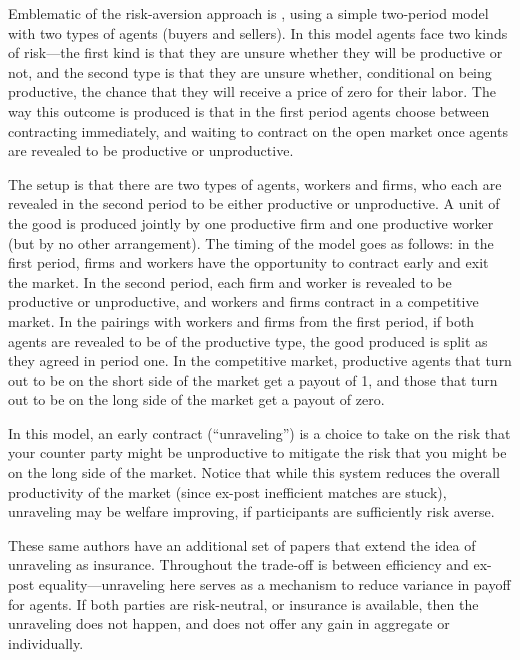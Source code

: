 \documentclass[WP]{AEA}
\begin{document}
Emblematic of the risk-aversion approach is \cite{Li1998}, using a simple two-period model with two types of agents (buyers and sellers).  
In this model agents face two kinds of risk—the first kind is that they are unsure whether they will be productive or not, and the second type is that they are unsure whether, conditional on being productive, the chance that they will receive a price of zero for their labor.  The way this outcome is produced is that in the first period agents choose between contracting immediately, and waiting to contract on the open market once agents are revealed to be productive or unproductive.  

The setup is that there are two types of agents, workers and firms, who each are revealed in the second period to be either productive or unproductive. A unit of the good is produced jointly by one productive firm and one productive worker (but by no other arrangement). The timing of the model goes as follows: in the first period, firms and workers have the opportunity to contract early and exit the market. In the second period, each firm and worker is revealed  to be productive or unproductive, and workers and firms contract in a competitive market.  In the pairings with workers and firms from the first period, if both agents are revealed to be of the productive type, the good produced is split as they agreed in period one. In the competitive market, productive agents that turn out to be on the short side of the market get a payout of 1, and those that turn out to be on the long side of the market get a payout of zero.


In this model, an early contract (``unraveling'')  is a choice to take on the risk that your counter party might be unproductive to mitigate the risk that you might be on the long side of the market.  Notice that while this system reduces the overall productivity of the market (since ex-post inefficient matches are stuck), unraveling may be welfare improving, if participants are sufficiently risk averse.

These same authors have an additional set of papers \cite{Li2000,Li2004}  that extend the idea of unraveling as insurance.  Throughout the trade-off is between efficiency and ex-post equality—unraveling here serves as a mechanism to reduce variance in payoff for agents.  If both parties are risk-neutral, or insurance is available, then the unraveling does not happen, and does not offer any gain in aggregate or individually.
\end{document}
